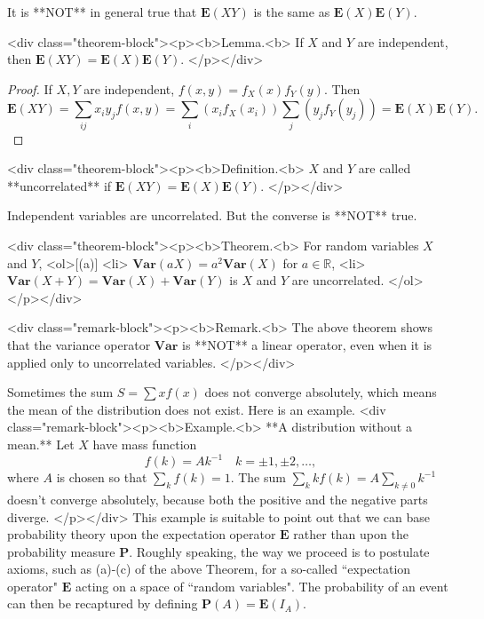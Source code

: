 \begin{caution}
It is **NOT** in general true that $\mathbf{E}(XY)$ is the same as $\mathbf{E}(X)\mathbf{E}(Y)$. 
\end{caution}

<div class="theorem-block"><p><b>Lemma.<b> 
If $X$ and $Y$ are independent, then $\mathbf{E}(XY) = \mathbf{E}(X)\mathbf{E}(Y)$. 
</p></div>
\begin{proof}
If $X, Y$ are independent, $f(x,y) = f_X(x) f_Y(y)$. Then
$$\begin{equation}
    \mathbf{E}(XY) = \sum_{ij} x_i y_j f(x,y) = \sum_{i} \left( x_i f_X(x_i) \right) \sum_{j} \left( y_j f_Y(y_j) \right) = \mathbf{E}(X) \mathbf{E}(Y).
\end{equation}$$
\end{proof}

<div class="theorem-block"><p><b>Definition.<b> 
$X$ and $Y$ are called **uncorrelated** if $\mathbf{E}(XY) = \mathbf{E}(X)\mathbf{E}(Y)$.
</p></div>

\begin{caution}
Independent variables are uncorrelated. But the converse is **NOT** true.
\end{caution}

<div class="theorem-block"><p><b>Theorem.<b> 
For random variables $X$ and $Y$, 
<ol>[(a)]
    <li> $\mathbf{Var}(aX) = a^2 \mathbf{Var}(X)$ for $a \in \mathbb{R}$,
    <li> $\mathbf{Var}(X+Y) = \mathbf{Var}(X) + \mathbf{Var}(Y)$ is $X$ and $Y$ are uncorrelated.
</ol>
</p></div>

<div class="remark-block"><p><b>Remark.<b> 
The above theorem shows that the variance operator $\mathbf{Var}$ is **NOT** a linear operator, even when it 
is applied only to uncorrelated variables. 
</p></div>

Sometimes the sum $S = \sum xf(x)$ does not converge absolutely, which means the mean of the distribution does not exist. Here is an example. 
<div class="remark-block"><p><b>Example.<b> 
**A distribution without a mean.** Let $X$ have mass function 
$$\begin{equation}
    f(k) = Ak^{-1} \quad k = \pm 1, \pm 2, \dots,
\end{equation}$$
where $A$ is chosen so that $\sum_k f(k) = 1$. The sum $\sum_k kf(k) = A\sum_{k\neq 0} k^{-1}$ doesn't converge absolutely, because both the positive and the negative parts diverge. 
</p></div>
This example is suitable to point out that we can base probability theory upon the expectation operator $\mathbf{E}$ rather than upon the probability measure $\mathbf{P}$. Roughly speaking, the way we proceed is to postulate axioms, such as (a)-(c) of the above Theorem, for a so-called ``expectation operator" $\mathbf{E}$ acting on a space of ``random variables". The probability of an event can then be recaptured by defining $\mathbf{P}(A) = \mathbf{E}(I_A)$.  

